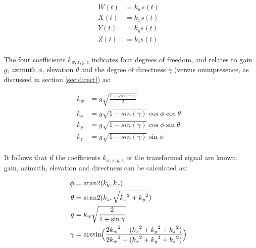 \documentclass{article}
\begin{document}
\begin{equation} \label{eq:encoded}
\begin{split}
W(t) & = k_w s(t) \\
X(t) & = k_x s(t) \\
Y(t) & = k_y s(t) \\
Z(t) & = k_z s(t) \\
\end{split}
\end{equation}

The four coefficients $k_{w, x, y, z}$ indicates four degrees of freedom, and relates to gain $g$, azimuth $\phi$, elevation $\theta$ and the degree of directness $\gamma$ (versus omnipresence, as discussed in section \ref{sec:direct}) as:

\begin{equation} \label{eq:encodedCoefficients}
\begin{split}
k_w & = g \sqrt{ \frac{1 + sin(\gamma)} {2} } \\
k_x & = g \sqrt{ 1 - sin(\gamma) } \cos{\phi} \cos{\theta} \\
k_y & = g \sqrt{ 1 - sin(\gamma) } \cos{\phi} \sin{\theta} \\
k_z & = g \sqrt{ 1 - sin(\gamma) } \sin{\phi}               \\
\end{split}
\end{equation}

It follows that if the coefficients $k_{w, x, y, z}$ of the transformed signal are known, gain, azimuth, elevation and directness can be calculated as:

\begin{equation} \label{eq:interpreteCoefficients}
\begin{split}
\phi   & = \textnormal{atan2}(k_y, k_x) \\
\theta & = \textnormal{atan2}(k_z, \sqrt{{k_x}^2 + {k_y}^2}) \\
g      & = k_w \sqrt{ \frac{2}{1 + \sin{\gamma} } }\\
\gamma & = \textnormal{arcsin} \Big( \frac{2 {k_w}^2 - ({k_x}^2 + {k_y}^2 +{k_z}^2)} {2 {k_w}^2 + ({k_x}^2 + {k_y}^2 +{k_z}^2 )} \Big)
\end{split}
\end{equation}
\end{document}
